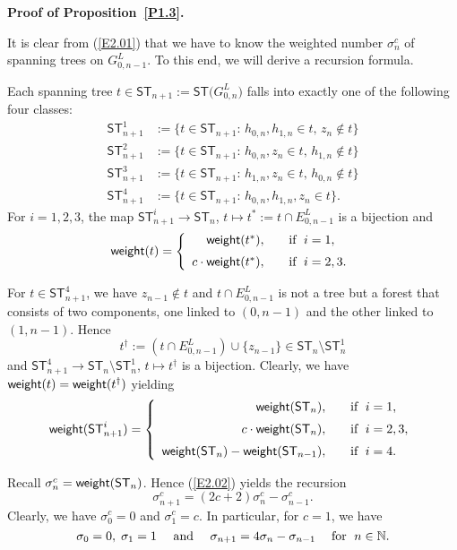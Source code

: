 \documentclass[11pt]{article}
\providecommand{\1}{\mathBB{1}}
\newcommand{\mfalls}{\quad\mbox{if \;}}
\renewcommand{\cases}[1]{\left\{\begin{array}{rl}#1\end{array}\right.}
\newcommand{\mbu}{\quad\mbox{ and }\quad}
\newcommand{\mf}{\quad\mbox{\;for \;}}
\newcommand{\N}{{\mathbb{N}}}
\newcommand{\equ}[1]{(\ref{#1})}
\def\SPT{\mathsf{ST}}
\newcommand{\weight}{\mathop{\mbox{\sf weight}}}
\begin{document}
\textbf{Proof of Proposition~\ref{P1.3}.}\par
It is clear from \equ{E2.01} that we have to know the weighted number $\sigma^c_n$ of  spanning trees on $G^L_{0,n-1}$. To this end, we will derive a recursion formula.

Each spanning tree $t\in\SPT_{n+1}:=\SPT\big(G^L_{0,n}\big)$ falls into exactly one of the following four classes:
\begin{equation}
\label{defSTi}
\begin{aligned}
\SPT^1_{n+1}&:=\big\{t\in\SPT_{n+1}:\,h_{0,n},h_{1,n}\in t,\,z_n\not\in t\big\}\\
\SPT^2_{n+1}&:=\big\{t\in\SPT_{n+1}:\,h_{0,n},z_n\in t,\,h_{1,n}\not\in t\big\}\\
\SPT^3_{n+1}&:=\big\{t\in\SPT_{n+1}:\,h_{1,n},z_n\in t,\,h_{0,n}\not\in t\big\}\\
\SPT^4_{n+1}&:=\big\{t\in\SPT_{n+1}:\,h_{0,n},h_{1,n},z_n\in t\big\}.
\end{aligned}
\end{equation}
For $i=1,2,3$, the map $\SPT^i_{n+1}\to\SPT_n$, $t\mapsto t^*:=t\cap E^L_{0,n-1}$ is a bijection and
$$\weight(t)=\cases{\weight(t^*),&\mfalls i=1,\\[2mm]c\cdot\weight(t^*),&\mfalls i=2,3.}$$

For $t\in\SPT^4_{n+1}$, we have $z_{n-1}\not\in t$ and $t\cap E^L_{0,n-1}$ is not a tree but a forest that consists of two components, one linked to $(0,n-1)$ and the other linked to $(1,n-1)$. Hence
$$t^\dagger:=(t\cap E^L_{0,n-1})\cup\{z_{n-1}\}\in\SPT_n\setminus\SPT^1_{n}$$
and $\SPT^4_{n+1}\to\SPT_n\setminus\SPT^1_n$, $t\mapsto t^\dagger$ is a bijection. Clearly, we have $\weight(t)=\weight(t^\dagger)$ yielding
\begin{equation}
\label{E2.02}
\weight(\SPT^i_{n+1})=\cases{
\weight(\SPT_n),&\mfalls i=1,\\[2mm]
c\cdot \weight(\SPT_n),&\mfalls i=2,3,\\[2mm]
\weight(\SPT_n)-\weight(\SPT_{n-1}),&\mfalls i=4.}
\end{equation}


Recall $\sigma^c_n=\weight(\SPT_n)$. Hence \equ{E2.02} yields the recursion
\begin{equation}
\label{E2.03}
\sigma^c_{n+1}=(2c+2)\sigma^c_n-\sigma^c_{n-1}.
\end{equation}
Clearly, we have $\sigma^c_0=0$ and $\sigma^c_1=c$. In particular, for $c=1$, we have
\begin{equation}
\label{E2.04}
\sigma_0=0,\;\sigma_1=1\mbu\sigma_{n+1}=4\sigma_n-\sigma_{n-1}\mf n\in\N.
\end{equation}
\end{document}
